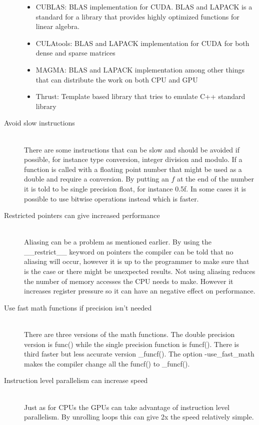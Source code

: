 \documentclass[10pt,a4paper]{report}
\begin{document}
\begin{description}
  \begin{itemize}
    \item CUBLAS: BLAS implementation for CUDA. BLAS and LAPACK is a standard for a library that provides highly optimized functions for linear algebra.\cite{cublas}
    \item CULAtools: BLAS and LAPACK implementation for CUDA for both dense and sparse matrices\cite{culatools}
    \item MAGMA: BLAS and LAPACK implementation among other things that can distribute the work on both CPU and GPU\cite{magma_2010}
    \item Thrust: Template based library that tries to emulate C++ standard library\cite{thrust_gpu}
  \end{itemize}
  \item[Avoid slow instructions] \hfill \\
  There are some instructions that can be slow and should be avoided if possible, for instance type conversion, integer division and modulo. If a function is called with a floating point number that might be used as a double and require a conversion. By putting an $f$ at the end of the number it is told to be single precision float, for instance 0.5f. In some cases it is possible to use bitwise operations instead which is faster.\cite{cuda, cuda_best_practice}
  \item[Restricted pointers can give increased performance] \hfill \\
  Aliasing can be a problem as mentioned earlier. By using the \_\_restrict\_\_ keyword on pointers the compiler can be told that no aliasing will occur, however it is up to the programmer to make sure that is the case or there might be unexpected results. Not using aliasing reduces the number of memory accesses the CPU needs to make. However it increases register pressure so it can have an negative effect on performance.\cite{cuda}
  \item[Use fast math functions if precision isn't needed] \hfill \\
  There are three versions of the math functions. The double precision version is func() while the single precision function is funcf(). There is third faster but less accurate version \_funcf(). The option -use\_fast\_math makes the compiler change all the funcf() to \_funcf().\cite{cuda_best_practice}
  \item[Instruction level parallelism can increase speed]\hfill \\
  Just as for CPUs the GPUs can take advantage of instruction level parallelism. By unrolling loops this can give 2x the speed relatively simple\cite{volkov2011unrolling}.
\end{description}
\end{document}

